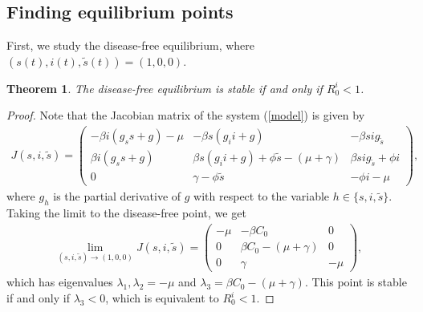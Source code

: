 \documentclass[sn-basic]{sn-jnl}%
\theoremstyle{thmstyleone}%
\newtheorem{theorem}{Theorem}%
\theoremstyle{thmstyletwo}%
\theoremstyle{thmstylethree}%
\newcommand{\ws}{\widetilde{s}}
\begin{document}
\subsection{Finding equilibrium points}

First, we study the disease-free equilibrium, where $(s(t),i(t),\ws(t)) = (1,0,0)$. 

\begin{theorem}
    The disease-free equilibrium is stable if and only if $R_0^i < 1$.
\end{theorem}

\begin{proof}
    Note that the Jacobian matrix of the system (\ref{model}) is given by
    \begin{align*}
        J(s,i,\ws) = \begin{pmatrix}
        -\beta i ( g_s s + g) - \mu & -\beta s (g_i i + g) & -\beta s i g_{\ws} \\
        \beta i ( g_s s + g) & \beta s (g_i i + g) + \phi \ws - (\mu + \gamma) & \beta s i g_{\ws} + \phi i \\
        0 & \gamma - \phi \ws & - \phi i - \mu
        \end{pmatrix},
    \end{align*}
    where $g_h$ is the partial derivative of $g$ with respect to the variable $h \in \{s,i,\ws \}$. Taking the limit to the disease-free point, we get
    \begin{align*}
        \lim_{(s,i,\ws) \to (1,0,0)} J(s,i,\ws) = \begin{pmatrix}
        - \mu & -\beta C_0 & 0 \\
        0 & \beta C_0 - (\mu + \gamma) & 0 \\
        0 & \gamma & - \mu
        \end{pmatrix},
    \end{align*}
    which has eigenvalues $\lambda_1, \lambda_2 = - \mu$ and $\lambda_3 = \beta C_0 - (\mu + \gamma)$. This point is stable if and only if $\lambda_3<0$, which is equivalent to $R_0^i<1$.
 \end{proof}
\end{document}

